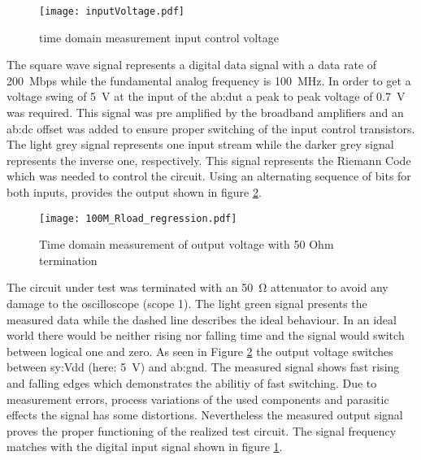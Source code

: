 \begin{figure}[htb!]
	\centering
  \texttt{[image: inputVoltage.pdf]}
	\caption{time domain measurement input control voltage}
	\label{fig:inputMeas}
\end{figure}

The square wave signal represents a digital data signal with a data rate of \SI{200}{Mbps} while the fundamental analog frequency is \SI{100}{\mega \hertz}.
In order to get a voltage swing of \SI{5}{\volt} at the input of the \gls{ab:dut} a peak to peak voltage of \SI{0.7}{\volt} was required.
This signal was pre amplified by the broadband amplifiers and an \gls{ab:dc} offset was added to ensure proper switching of the input control transistors.
The light grey signal represents one input stream while the darker grey signal represents the inverse one, respectively.
This signal represents the Riemann Code which was needed to control the circuit.
Using an alternating sequence of bits for both inputs, provides the output shown in figure \ref{fig:measRload100M}.

\begin{figure}[htb!]
	\centering
  \texttt{[image: 100M\_Rload\_regression.pdf]}
	\caption{Time domain measurement of output voltage with 50 Ohm termination}
	\label{fig:measRload100M}
\end{figure}

The circuit under test was terminated with an \SI{50}{\ohm} attenuator to avoid any damage to the oscilloscope (scope 1).
The light green signal presents the measured data while the dashed line describes the ideal behaviour.
In an ideal world there would be neither rising nor falling time and the signal would switch between logical one and zero.
As seen in Figure \ref{fig:measRload100M} the output voltage switches between \gls{sy:Vdd} (here: \SI{5}{\volt}) and \gls{ab:gnd}. 
The measured signal shows fast rising and falling edges which demonstrates the abilitiy of fast switching. 
Due to measurement errors, process variations of the used components and parasitic effects the signal has some distortions.
Nevertheless the measured output signal proves the proper functioning of the realized test circuit.
The signal frequency matches with the digital input signal shown in figure \ref{fig:inputMeas}.

